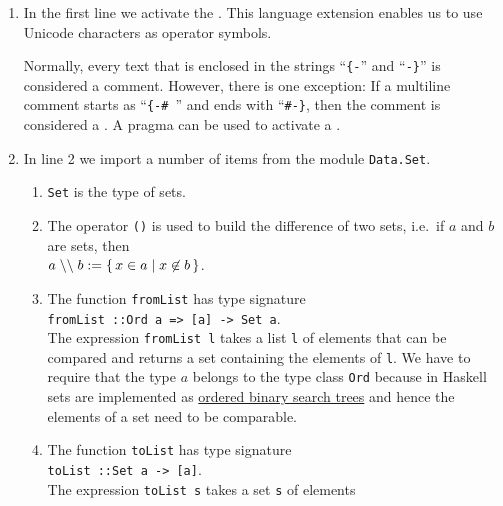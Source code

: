 \begin{enumerate}
\item In the first line we activate the .  This language extension enables us
      to use Unicode characters as operator symbols.

      Normally, every text that is enclosed in the strings ``\texttt{\{-}'' and ``\texttt{-\}}'' is considered a comment.
      However, there is one exception:  If a multiline comment starts as ``\texttt{\{-\# }'' and ends
      with ``\texttt{\#-\}}, then the comment is considered a . A pragma can be used to activate a
      . 
\item In line 2 we import a number of items from the module \texttt{Data.Set}.
      \begin{enumerate}
      \item \texttt{Set} is the type of sets.
      \item The operator \texttt{()} is used to build the difference of two sets, i.e.~if
            $a$ and $b$ are sets, then
            \\[0.2cm]
            \hspace*{1.3cm}
            $a \;\mathtt{\symbol{92}\symbol{92}}\; b := \{\, x \in a \mid x \not\in b \,\}$.
      \item The function \texttt{fromList} has type signature
            \\[0.2cm]
            \hspace*{1.3cm}
            \texttt{fromList ::\;Ord a => [a] -> Set a}.
            \\[0.2cm]
            The expression \texttt{fromList l} takes a list \texttt{l} of elements that can be compared
            and returns a set containing the elements of \texttt{l}.  We have to require that the type $a$
            belongs to the type class \texttt{Ord} because in Haskell sets are implemented as
            \href{https://en.wikipedia.org/wiki/Binary_search_tree}{ordered binary search trees} and hence the
            elements of a set need to be comparable. 
      \item The function \texttt{toList} has type signature
            \\[0.2cm]
            \hspace*{1.3cm}
            \texttt{toList ::\;Set a -> [a]}.
            \\[0.2cm]
            The expression \texttt{toList s} takes a set \texttt{s} of elements 

\end{enumerate}
\end{enumerate}
